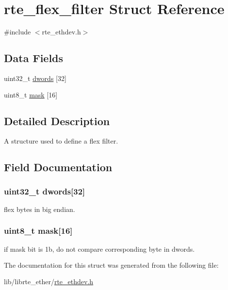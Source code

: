 \hypertarget{structrte__flex__filter}{}\section{rte\+\_\+flex\+\_\+filter Struct Reference}
\label{structrte__flex__filter}


{\ttfamily \#include $<$rte\+\_\+ethdev.\+h$>$}

\subsection*{Data Fields}
\begin{DoxyCompactItemize}
\item 
uint32\+\_\+t \hyperlink{structrte__flex__filter_aff76ed94001f001ee589540f35693fdb}{dwords} \mbox{[}32\mbox{]}
\item 
uint8\+\_\+t \hyperlink{structrte__flex__filter_aba1a3cf1fb64379a52088988aab82b89}{mask} \mbox{[}16\mbox{]}
\end{DoxyCompactItemize}


\subsection{Detailed Description}
A structure used to define a flex filter. 

\subsection{Field Documentation}
\hypertarget{structrte__flex__filter_aff76ed94001f001ee589540f35693fdb}{}
\subsubsection[{dwords}]{\setlength{\rightskip}{0pt plus 5cm}uint32\+\_\+t dwords\mbox{[}32\mbox{]}}\label{structrte__flex__filter_aff76ed94001f001ee589540f35693fdb}
flex bytes in big endian. \hypertarget{structrte__flex__filter_aba1a3cf1fb64379a52088988aab82b89}{}
\subsubsection[{mask}]{\setlength{\rightskip}{0pt plus 5cm}uint8\+\_\+t mask\mbox{[}16\mbox{]}}\label{structrte__flex__filter_aba1a3cf1fb64379a52088988aab82b89}
if mask bit is 1b, do not compare corresponding byte in dwords. 

The documentation for this struct was generated from the following file\+:\begin{DoxyCompactItemize}
\item 
lib/librte\+\_\+ether/\hyperlink{rte__ethdev_8h}{rte\+\_\+ethdev.\+h}\end{DoxyCompactItemize}
